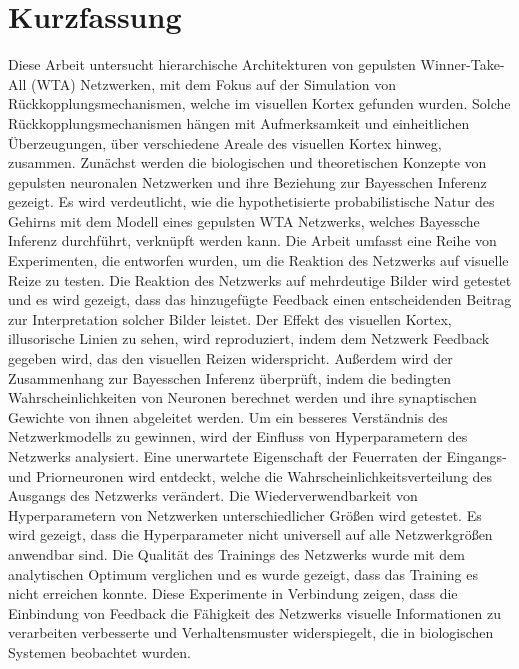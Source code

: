 \section*{Kurzfassung}
\label{cha:abstractGerman}

Diese Arbeit untersucht hierarchische Architekturen von gepulsten Winner-Take-All (WTA) Netzwerken, mit dem Fokus auf der Simulation von Rückkopplungsmechanismen, welche im visuellen Kortex gefunden wurden. Solche Rückkopplungsmechanismen hängen mit Aufmerksamkeit und einheitlichen Überzeugungen, über verschiedene Areale des visuellen Kortex hinweg, zusammen.
Zunächst werden die biologischen und theoretischen Konzepte von gepulsten neuronalen Netzwerken und ihre Beziehung zur Bayesschen Inferenz gezeigt. Es wird verdeutlicht, wie die hypothetisierte probabilistische Natur des Gehirns mit dem Modell eines gepulsten WTA Netzwerks, welches Bayessche Inferenz durchführt, verknüpft werden kann.
Die Arbeit umfasst eine Reihe von Experimenten, die entworfen wurden, um die Reaktion des Netzwerks auf visuelle Reize zu testen. Die Reaktion des Netzwerks auf mehrdeutige Bilder wird getestet und es wird gezeigt, dass das hinzugefügte Feedback einen entscheidenden Beitrag zur Interpretation solcher Bilder leistet. Der Effekt des visuellen Kortex, illusorische Linien zu sehen, wird reproduziert, indem dem Netzwerk Feedback gegeben wird, das den visuellen Reizen widerspricht. Außerdem wird der Zusammenhang zur Bayesschen Inferenz überprüft, indem die bedingten Wahrscheinlichkeiten von Neuronen berechnet werden und ihre synaptischen Gewichte von ihnen abgeleitet werden. Um ein besseres Verständnis des Netzwerkmodells zu gewinnen, wird der Einfluss von Hyperparametern des Netzwerks analysiert. Eine unerwartete Eigenschaft der Feuerraten der Eingangs- und Priorneuronen wird entdeckt, welche die Wahrscheinlichkeitsverteilung des Ausgangs des Netzwerks verändert. Die Wiederverwendbarkeit von Hyperparametern von Netzwerken unterschiedlicher Größen wird getestet. Es wird gezeigt, dass die Hyperparameter nicht universell auf alle Netzwerkgrößen anwendbar sind. Die Qualität des Trainings des Netzwerks wurde mit dem analytischen Optimum verglichen und es wurde gezeigt, dass das Training es nicht erreichen konnte. Diese Experimente in Verbindung zeigen, dass die Einbindung von Feedback die Fähigkeit des Netzwerks visuelle Informationen zu verarbeiten verbesserte und Verhaltensmuster widerspiegelt, die in biologischen Systemen beobachtet wurden.

